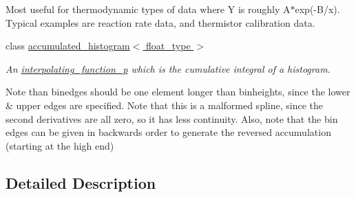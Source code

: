 \begin{DoxyCompactItemize}
\begin{DoxyCompactList}
Most useful for thermodynamic types of data where Y is roughly A$\ast$exp(-\/\+B/x). Typical examples are reaction rate data, and thermistor calibration data. \end{DoxyCompactList}\item 
class \hyperlink{classaccumulated__histogram}{accumulated\+\_\+histogram$<$ float\+\_\+type $>$}
\begin{DoxyCompactList}\small\item\em An \hyperlink{classinterpolating__function__p}{interpolating\+\_\+function\+\_\+p} which is the cumulative integral of a histogram.

Note than binedges should be one element longer than binheights, since the lower \& upper edges are specified. Note that this is a malformed spline, since the second derivatives are all zero, so it has less continuity. Also, note that the bin edges can be given in backwards order to generate the reversed accumulation (starting at the high end) \end{DoxyCompactList}\end{DoxyCompactItemize}


\subsection{Detailed Description}
